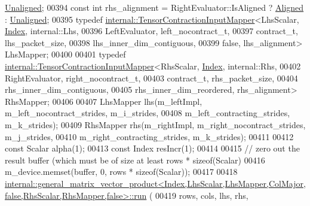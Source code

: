 \begin{DoxyCode}
      \hyperlink{group__enums_gga45fe06e29902b7a2773de05ba27b47a1ac935220b4c844108e183ebe30a4d5204}{Unaligned};
00394     \textcolor{keyword}{const} \textcolor{keywordtype}{int} rhs\_alignment = RightEvaluator::IsAligned ? \hyperlink{group__enums_gga45fe06e29902b7a2773de05ba27b47a1ad37d4c71425bb286e9b4103830538fbf}{Aligned} : 
      \hyperlink{group__enums_gga45fe06e29902b7a2773de05ba27b47a1ac935220b4c844108e183ebe30a4d5204}{Unaligned};
00395     \textcolor{keyword}{typedef} \hyperlink{class_eigen_1_1internal_1_1_tensor_contraction_input_mapper}{internal::TensorContractionInputMapper}<LhsScalar, 
      \hyperlink{namespace_eigen_a62e77e0933482dafde8fe197d9a2cfde}{Index}, internal::Lhs,
00396                                                    LeftEvaluator, left\_nocontract\_t,
00397                                                    contract\_t, lhs\_packet\_size,
00398                                                    lhs\_inner\_dim\_contiguous,
00399                                                    \textcolor{keyword}{false}, lhs\_alignment> LhsMapper;
00400 
00401     \textcolor{keyword}{typedef} \hyperlink{class_eigen_1_1internal_1_1_tensor_contraction_input_mapper}{internal::TensorContractionInputMapper}<RhsScalar, 
      \hyperlink{namespace_eigen_a62e77e0933482dafde8fe197d9a2cfde}{Index}, internal::Rhs,
00402                                                    RightEvaluator, right\_nocontract\_t,
00403                                                    contract\_t, rhs\_packet\_size,
00404                                                    rhs\_inner\_dim\_contiguous,
00405                                                    rhs\_inner\_dim\_reordered, rhs\_alignment> RhsMapper;
00406 
00407     LhsMapper lhs(m\_leftImpl, m\_left\_nocontract\_strides, m\_i\_strides,
00408                   m\_left\_contracting\_strides, m\_k\_strides);
00409     RhsMapper rhs(m\_rightImpl, m\_right\_nocontract\_strides, m\_j\_strides,
00410                   m\_right\_contracting\_strides, m\_k\_strides);
00411 
00412     \textcolor{keyword}{const} Scalar alpha(1);
00413     \textcolor{keyword}{const} Index resIncr(1);
00414 
00415     \textcolor{comment}{// zero out the result buffer (which must be of size at least rows * sizeof(Scalar)}
00416     m\_device.memset(buffer, 0, rows * \textcolor{keyword}{sizeof}(Scalar));
00417 
00418     
      \hyperlink{struct_eigen_1_1internal_1_1general__matrix__vector__product}{
      internal::general\_matrix\_vector\_product<Index,LhsScalar,LhsMapper,ColMajor,false,RhsScalar,RhsMapper,false>::run}
      (
00419         rows, cols, lhs, rhs,

\end{DoxyCode}
